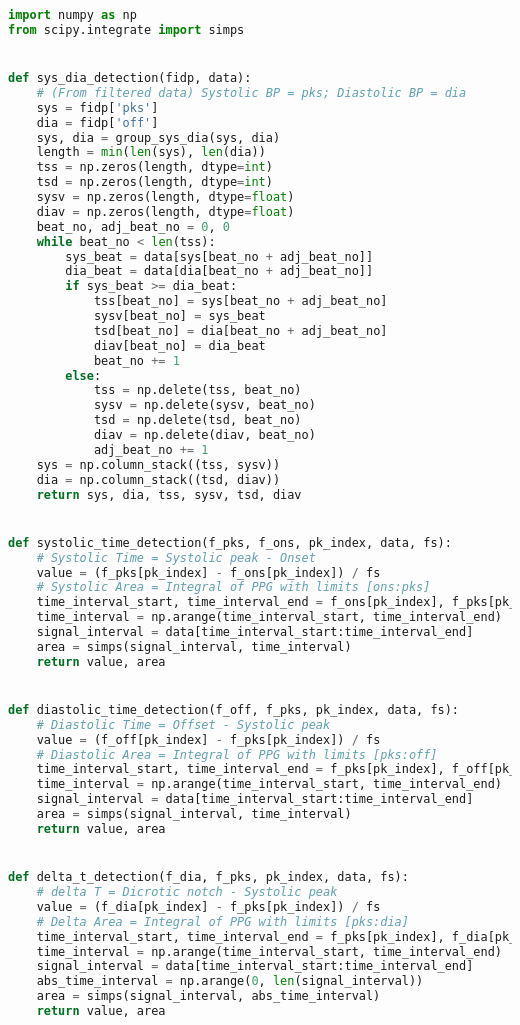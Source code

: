 \begin{lstlisting}[language=Python,label={lst:fe.py}, basicstyle=\scriptsize]
import numpy as np
from scipy.integrate import simps


def sys_dia_detection(fidp, data):
    # (From filtered data) Systolic BP = pks; Diastolic BP = dia
    sys = fidp['pks']
    dia = fidp['off']
    sys, dia = group_sys_dia(sys, dia)
    length = min(len(sys), len(dia))
    tss = np.zeros(length, dtype=int)
    tsd = np.zeros(length, dtype=int)
    sysv = np.zeros(length, dtype=float)
    diav = np.zeros(length, dtype=float)
    beat_no, adj_beat_no = 0, 0
    while beat_no < len(tss):
        sys_beat = data[sys[beat_no + adj_beat_no]]
        dia_beat = data[dia[beat_no + adj_beat_no]]
        if sys_beat >= dia_beat:
            tss[beat_no] = sys[beat_no + adj_beat_no]
            sysv[beat_no] = sys_beat
            tsd[beat_no] = dia[beat_no + adj_beat_no]
            diav[beat_no] = dia_beat
            beat_no += 1
        else:
            tss = np.delete(tss, beat_no)
            sysv = np.delete(sysv, beat_no)
            tsd = np.delete(tsd, beat_no)
            diav = np.delete(diav, beat_no)
            adj_beat_no += 1
    sys = np.column_stack((tss, sysv))
    dia = np.column_stack((tsd, diav))
    return sys, dia, tss, sysv, tsd, diav


def systolic_time_detection(f_pks, f_ons, pk_index, data, fs):
    # Systolic Time = Systolic peak - Onset
    value = (f_pks[pk_index] - f_ons[pk_index]) / fs
    # Systolic Area = Integral of PPG with limits [ons:pks]
    time_interval_start, time_interval_end = f_ons[pk_index], f_pks[pk_index]
    time_interval = np.arange(time_interval_start, time_interval_end)
    signal_interval = data[time_interval_start:time_interval_end]
    area = simps(signal_interval, time_interval)
    return value, area


def diastolic_time_detection(f_off, f_pks, pk_index, data, fs):
    # Diastolic Time = Offset - Systolic peak
    value = (f_off[pk_index] - f_pks[pk_index]) / fs
    # Diastolic Area = Integral of PPG with limits [pks:off]
    time_interval_start, time_interval_end = f_pks[pk_index], f_off[pk_index]
    time_interval = np.arange(time_interval_start, time_interval_end)
    signal_interval = data[time_interval_start:time_interval_end]
    area = simps(signal_interval, time_interval)
    return value, area


def delta_t_detection(f_dia, f_pks, pk_index, data, fs):
    # delta T = Dicrotic notch - Systolic peak
    value = (f_dia[pk_index] - f_pks[pk_index]) / fs
    # Delta Area = Integral of PPG with limits [pks:dia]
    time_interval_start, time_interval_end = f_pks[pk_index], f_dia[pk_index]
    time_interval = np.arange(time_interval_start, time_interval_end)
    signal_interval = data[time_interval_start:time_interval_end]
    abs_time_interval = np.arange(0, len(signal_interval))
    area = simps(signal_interval, abs_time_interval)
    return value, area



\end{lstlisting}
